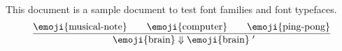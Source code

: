 \documentclass{article}
\begin{document}
\newcommand\note{\text{\emoji{musical-note}}}
\newcommand\brain{\text{\emoji{brain}}}
\newcommand\pingpong{\text{\emoji{ping-pong}}}
\newcommand\computer{\text{\emoji{computer}}}

This document is a sample document to 
test font families and font typefaces.
\huge
\[
    \begin{aligned}
        &\frac{\note \quad \quad \computer \quad \quad \pingpong}
            {\text{$\;\,\brain \Downarrow \brain\;'$}} \\
    \end{aligned}
\]
\end{document}
